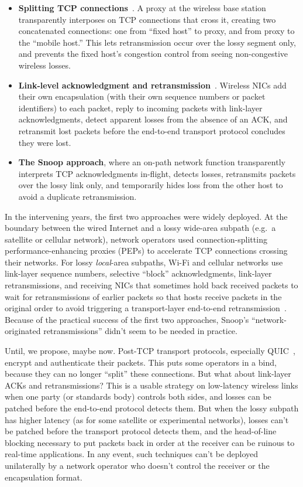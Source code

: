 \begin{itemize}[noitemsep]
\item \textbf{Splitting TCP connections}~\cite{bakreitcp1994, bb95}. A
  proxy at the wireless base station transparently interposes on TCP
  connections that cross it, creating two concatenated connections:
  one from ``fixed host'' to proxy, and from proxy to the ``mobile
  host.'' This lets retransmission occur over the lossy segment only,
  and prevents the fixed host's congestion control from seeing
  non-congestive wireless losses.

\item \textbf{Link-level acknowledgment and
  retransmission}~\cite{palplus}. Wireless NICs add their own
  encapsulation (with their own sequence numbers or packet
  identifiers) to each packet, reply to incoming packets with
  link-layer acknowledgments, detect apparent losses from the absence
  of an ACK, and retransmit lost packets before the end-to-end
  transport protocol concludes they were lost.

\item \textbf{The Snoop approach}, where an on-path network function
  transparently interprets TCP acknowledgments in-flight, detects
  losses, retransmits packets over the lossy link only, and
  temporarily hides loss from the other host to avoid a duplicate
  retransmission.
\end{itemize}

In the intervening years, the first two approaches were widely
deployed. At the boundary between the wired Internet and a lossy
wide-area subpath (e.g.~a satellite or cellular network), network
operators used connection-splitting performance-enhancing proxies
(PEPs) to accelerate TCP connections crossing their networks. For
lossy \emph{local}-area subpaths, Wi-Fi and cellular networks use
link-layer sequence numbers, selective ``block'' acknowledgments,
link-layer retransmissions, and receiving NICs that sometimes hold
back received packets to wait for retransmissions of earlier packets
so that hosts receive packets in the original order to avoid
triggering a transport-layer end-to-end retransmission~\cite{rfc3366,
  rfc8985, ieee802.1ac, 5Greorder}. Because of the practical success of
the first two approaches, Snoop's ``network-originated
retransmissions'' didn't seem to be needed in practice.

Until, we propose, maybe now. Post-TCP transport protocols,
especially QUIC~\cite{rfc9000}, encrypt and authenticate their
packets. This puts some operators in a bind, because they can no longer
``split'' these connections.
But what about link-layer ACKs and retransmissions?
This is a usable strategy on low-latency wireless links when one party
(or standards body) controls both sides, and losses can be patched
before the end-to-end protocol detects them. But when the lossy
subpath has higher latency (as for some satellite or experimental
networks), losses can't be patched before the transport protocol
detects them, and the head-of-line blocking necessary to put
packets back in order at the receiver can be ruinous to real-time
applications. In any event, such techniques can't be deployed
unilaterally by a network operator who doesn't control the receiver or
the encapsulation format.

